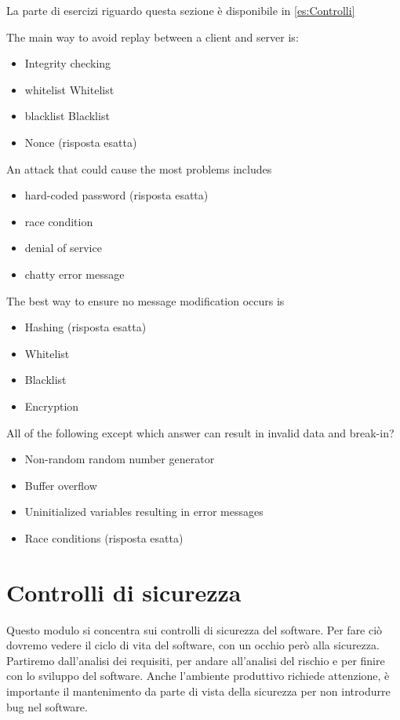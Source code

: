 La parte di esercizi riguardo questa sezione è disponibile in \ref{es:Controlli}

The main way to avoid replay between a client and server is:
\begin{itemize}
\item Integrity checking
\item whitelist Whitelist
\item blacklist Blacklist
\item Nonce (risposta esatta)
\end{itemize}


An attack that could cause the most problems includes
\begin{itemize}
\item hard-coded password (risposta esatta)
\item race condition
\item denial of service
\item chatty error message
\end{itemize}

The best way to ensure no message modification occurs is
\begin{itemize}
\item Hashing (risposta esatta)
\item Whitelist
\item Blacklist
\item Encryption
\end{itemize}


All of the following except which answer can result in invalid data and 
break-in?
\begin{itemize}
\item Non-random random number generator
\item Buffer overflow
\item Uninitialized variables resulting in error messages
\item Race conditions (risposta esatta)
\end{itemize}


\part{Controlli di sicurezza}

Questo modulo si concentra sui controlli di sicurezza del software. Per fare ciò 
dovremo vedere il ciclo di vita del software, con un occhio però alla sicurezza.
Partiremo dall'analisi dei requisiti, per andare all'analisi del rischio e per 
finire con lo sviluppo del software.
Anche l'ambiente produttivo richiede attenzione, è importante il mantenimento da 
parte di vista della sicurezza per non introdurre bug nel software.

